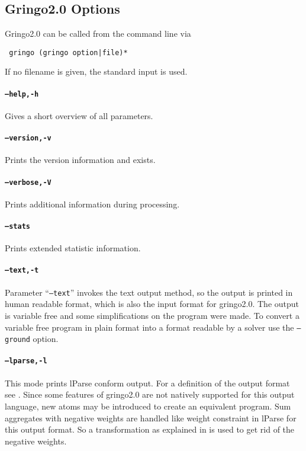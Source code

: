 \documentclass[a4paper,10pt]{article}
\begin{document}
\subsection{Gringo2.0 Options}
Gringo2.0 can be called from the command line via
\begin{verbatim}
 gringo (gringo option|file)*
\end{verbatim}
If no filename is given, the standard input is used.

\paragraph{\texttt{--help,-h}}
Gives a short overview of all parameters.
\paragraph{\texttt{--version,-v}}
Prints the version information and exists.
\paragraph{\texttt{--verbose,-V}}
Prints additional information during processing.
\paragraph{\texttt{--stats}}
Prints extended statistic information.

\paragraph{\texttt{--text,-t}}
Parameter ``\texttt{--text}'' invokes the text output method, so the output is printed in human readable format, which is also the input format for gringo2.0. The output is variable free and some simplifications on the program were made. To convert a variable free program in plain format into a format readable by a solver use the \texttt{--ground} option.
\paragraph{\texttt{--lparse,-l}}
This mode prints lParse conform output. For a definition of the output format see \cite{lparseManual}.
Since some features of gringo2.0 are not natively supported for this output language, new atoms may be introduced to create an equivalent program.\newline
Sum aggregates with negative weights are handled like weight constraint in lParse for this output format. So a transformation as explained in \cite{lparseManual} is used to get rid of the negative weights.
\end{document}
